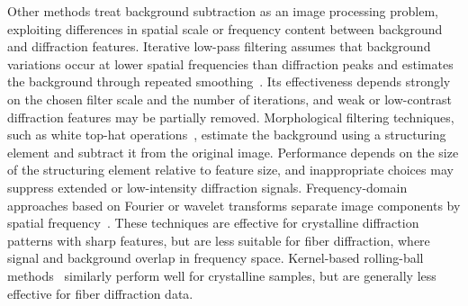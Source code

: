 \documentclass[iucr]{iucrjournals}
\begin{document}
Other methods treat background subtraction as an image processing problem, exploiting differences in spatial scale or frequency content between background and diffraction features. Iterative low-pass filtering assumes that background variations occur at lower spatial frequencies than diffraction peaks and estimates the background through repeated smoothing~\cite{IvanovaMakowski1998}. Its effectiveness depends strongly on the chosen filter scale and the number of iterations, and weak or low-contrast diffraction features may be partially removed. Morphological filtering techniques, such as white top-hat operations~\cite{GonzalezWoodsDIP4e}, estimate the background using a structuring element and subtract it from the original image. Performance depends on the size of the structuring element relative to feature size, and inappropriate choices may suppress extended or low-intensity diffraction signals. Frequency-domain approaches based on Fourier or wavelet transforms separate image components by spatial frequency~\cite{PolarBackground2024, WaveletBiomedOptExpress2021, renedecotret2017baseline}. These techniques are effective for crystalline diffraction patterns with sharp features, but are less suitable for fiber diffraction, where signal and background overlap in frequency space. Kernel-based rolling-ball methods~\cite{Sternberg1983} similarly perform well for crystalline samples, but are generally less effective for fiber diffraction data.
\end{document}
